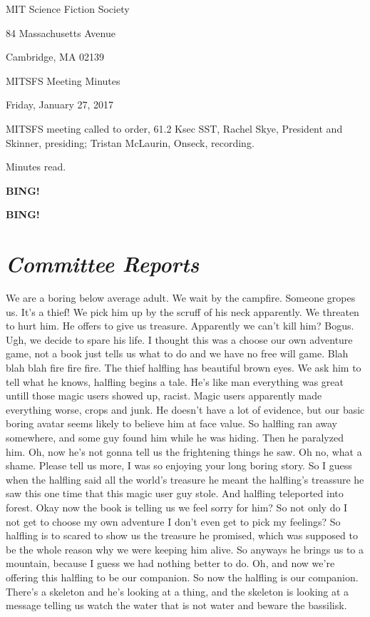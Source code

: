 \documentclass[10pt]{article}
\newcommand{\bing}{{\bf BING!} }
\newcommand{\goto}[1]{\bing \vskip 12pt \section*{{\em{#1}}}}
\newcommand{\skinner}{Rachel Skye, President and Skinner}
\newcommand{\onseck}{Tristan McLaurin, Onseck}
\newcommand{\meetingdate}{Friday, January 27, 2017}
\begin{document}
\begin{center}

MIT Science Fiction Society

84 Massachusetts Avenue

Cambridge, MA 02139

\vspace{12pt}

MITSFS Meeting Minutes

\meetingdate

\end{center}

\vspace{18pt}

\setlength{\parskip}{6pt}

\noindent
MITSFS meeting called to order, 61.2 Ksec SST,
\skinner, presiding; \onseck, recording.

Minutes read.

\bing

\goto{Committee Reports}
We are a boring below average adult. We wait by the campfire. Someone gropes us. It's a thief! We pick him up by the scruff of his neck apparently. We threaten to hurt him. He offers to give us treasure. Apparently we can't kill him? Bogus. Ugh, we decide to spare his life. I thought this was a choose our own adventure game, not a book just tells us what to do and we have no free will game. Blah blah blah fire fire fire. The thief halfling has beautiful brown eyes. We ask him to tell what he knows, halfling begins a tale. He's like man everything was great untill those magic users showed up, racist. Magic users apparently made everything worse, crops and junk. He doesn't have a lot of evidence, but our basic boring avatar seems likely to believe him at face value.
So halfling ran away somewhere, and some guy found him while he was hiding. Then he paralyzed him. Oh, now he's not gonna tell us the frightening things he saw. Oh no, what a shame. Please tell us more, I was so enjoying your long boring story. So I guess when the halfling said all the world's treasure he meant the halfling's treassure he saw this one time that  this magic user guy stole. And halfling teleported into forest.
Okay now the book is telling us we feel sorry for him? So not only do I not get to choose my own adventure I don't even get to pick my feelings?
So halfling is to scared to show us the treasure he promised, which was supposed to be the whole reason why we were keeping him alive. So anyways he brings us to a mountain, because I guess we had nothing better to do. Oh, and now we're offering this halfling to be our companion. So now the halfling is our companion. There's a skeleton and he's looking at a thing, and the skeleton is looking at a message telling us watch the water that is not water and beware the bassilisk. 
\end{document}
